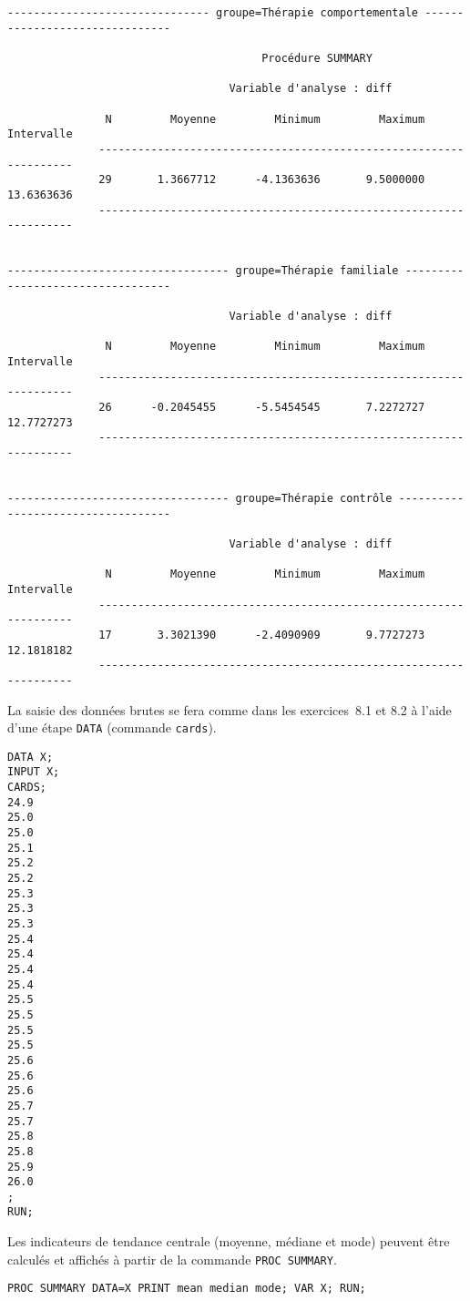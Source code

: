 \begin{verbatim}
------------------------------- groupe=Thérapie comportementale -------------------------------

                                       Procédure SUMMARY

                                  Variable d'analyse : diff

               N         Moyenne         Minimum         Maximum      Intervalle
              ------------------------------------------------------------------
              29       1.3667712      -4.1363636       9.5000000      13.6363636
              ------------------------------------------------------------------


---------------------------------- groupe=Thérapie familiale ----------------------------------

                                  Variable d'analyse : diff

               N         Moyenne         Minimum         Maximum      Intervalle
              ------------------------------------------------------------------
              26      -0.2045455      -5.5454545       7.2272727      12.7727273
              ------------------------------------------------------------------


---------------------------------- groupe=Thérapie contrôle -----------------------------------

                                  Variable d'analyse : diff

               N         Moyenne         Minimum         Maximum      Intervalle
              ------------------------------------------------------------------
              17       3.3021390      -2.4090909       9.7727273      12.1818182
              ------------------------------------------------------------------
\end{verbatim}
%
%
%
\soln{\ref{exo:8.4}}
La saisie des données brutes se fera comme dans les exercices~8.1 et 8.2 à
l'aide d'une étape \texttt{DATA} (commande \texttt{cards}).
\begin{verbatim}
DATA X;
INPUT X;
CARDS;
24.9
25.0
25.0
25.1
25.2
25.2
25.3
25.3
25.3
25.4
25.4
25.4
25.4
25.5
25.5
25.5
25.5
25.6
25.6
25.6
25.7
25.7
25.8
25.8
25.9
26.0
;
RUN;
\end{verbatim}

Les indicateurs de tendance centrale (moyenne, médiane et mode) peuvent être
calculés et affichés à partir de la commande \texttt{PROC SUMMARY}.
\begin{verbatim}
PROC SUMMARY DATA=X PRINT mean median mode; VAR X; RUN;
\end{verbatim}

